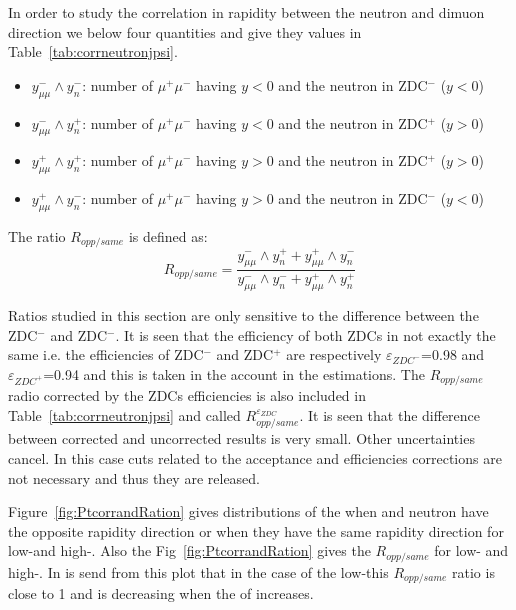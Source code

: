     In order to study the correlation in rapidity between the neutron and
      dimuon direction we below four quantities and give they values in 
      Table~\ref{tab:corrneutronjpsi}.  
    \begin{itemize}
      \item $y^{-}_{\mu\mu} \wedge y_{n}^{-}$: number of $\mu^{+}\mu^{-}$ having
         $y<0$ and the neutron in ZDC$^{-}$ ($y<0$)
      \item $y^{-}_{\mu\mu} \wedge y_{n}^{+}$: number of $\mu^{+}\mu^{-}$ having
         $y<0$ and the neutron in ZDC$^{+}$ ($y>0$)
      \item $y^{+}_{\mu\mu} \wedge y_{n}^{+}$: number of $\mu^{+}\mu^{-}$ having
         $y>0$ and the neutron in ZDC$^{+}$ ($y>0$)
      \item $y^{+}_{\mu\mu} \wedge y_{n}^{-}$: number of $\mu^{+}\mu^{-}$ having
         $y>0$ and the neutron in ZDC$^{-}$ ($y<0$)
    \end{itemize}

    The ratio $R_{opp/same}$ is defined as: 
    \begin{equation}
      R_{opp/same} = \frac{y^{-}_{\mu\mu} \wedge y_{n}^{+} + y^{+}_{\mu\mu} 
        \wedge y_{n}^{-}}{y^{-}_{\mu\mu} \wedge y_{n}^{-} + y^{+}_{\mu\mu} 
        \wedge y_{n}^{+}}
    \end{equation}
    
    Ratios studied in this section are only sensitive to the difference between
      the ZDC$^{-}$ and ZDC$^{-}$.
    It is seen that the efficiency of both ZDCs in not exactly the same i.e.
      the efficiencies of ZDC$^{-}$ and ZDC$^{+}$ are respectively 
      $\varepsilon_{ZDC^{-}}$=0.98 and  $\varepsilon_{ZDC^{+}}$=0.94 and this 
      is taken in the account in the estimations. 
    The $R_{opp/same}$ radio corrected by the ZDCs efficiencies is also 
      included in Table~\ref{tab:corrneutronjpsi} and called 
      $R_{opp/same}^{\varepsilon_{ZDC}}$. 
    It is seen that the difference between corrected and uncorrected results is
      very small. 
    Other uncertainties cancel. 
    In this case cuts related to the acceptance and efficiencies corrections 
      are not necessary and thus they are released.
    
    Figure~\ref{fig:PtcorrandRation} gives \pt distributions of the \JPsi 
      when \JPsi and neutron have the opposite rapidity direction or when they 
      have the same rapidity direction for low-\pt and high-\pt \JPsi. 
    Also the Fig~\ref{fig:PtcorrandRation} gives the $R_{opp/same}$ for low-\pt
      and high-\pt \JPsi. 
    In is send from this plot that in the case of the low-\pt \JPsi this 
      $R_{opp/same}$ ratio is close to 1 and is decreasing when the \pt of
      \JPsi increases.
  
